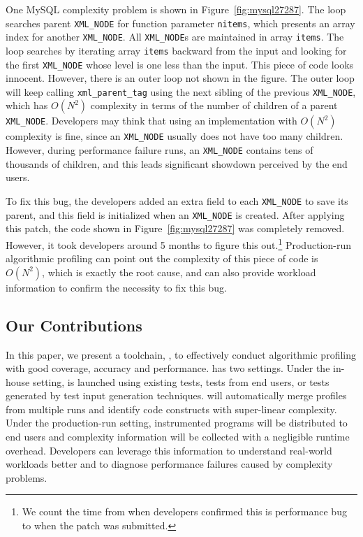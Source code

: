 


One MySQL complexity problem is shown in Figure~\ref{fig:mysql27287}.
The loop searches parent \texttt{XML\_NODE} for function parameter \texttt{nitems},
which presents an array index for another \texttt{XML\_NODE}.
All \texttt{XML\_NODE}s are maintained in array \texttt{items}.
The loop searches by iterating array \texttt{items}
backward from the input and looking for the first \texttt{XML\_NODE}
whose level is one less than the input.
This piece of code looks innocent.
However, there is an outer loop not shown in the figure.
The outer loop will keep calling \texttt{xml\_parent\_tag} using
the next sibling of the previous \texttt{XML\_NODE},
which has $O(N^2)$ complexity in terms of the number of children of a parent \texttt{XML\_NODE}.
Developers may think that using an implementation with $O(N^2)$ complexity is fine,
since an \texttt{XML\_NODE} usually does not have too many children.
However, during performance failure runs,
an \texttt{XML\_NODE} contains tens of thousands of children,
and this leads significant showdown perceived by the end users.

To fix this bug, the developers added an extra field to each \texttt{XML\_NODE} to save its parent,
and this field is initialized when an \texttt{XML\_NODE} is created.
After applying this patch, the code shown in Figure~\ref{fig:mysql27287} was completely removed.
However, it took developers around 5 months to figure this
out.\footnote{We count the time from when developers confirmed this is performance bug
to when the patch was submitted.}
Production-run algorithmic profiling 
can point out the complexity of this piece of code is $O(N^2)$, 
which is exactly the root cause, 
and can also provide workload information 
to confirm the necessity to fix this bug.



\subsection{Our Contributions}
\label{sec:con}

In this paper,
we present a toolchain, \Tool, to effectively conduct algorithmic profiling with
good coverage, accuracy and performance.
\Tool has two settings. %
Under the in-house setting,
\Tool is launched using existing tests, tests from end users,
or tests generated by test input generation techniques\cite{KLEE,s2e,dart,EventBreak}.
\Tool will automatically merge profiles from multiple runs and
identify code constructs with super-linear complexity.
Under the production-run setting,
instrumented programs will be distributed to end users
and complexity information will be collected with a negligible runtime overhead.
Developers can leverage this information to understand real-world workloads better
and to diagnose performance failures caused by complexity problems.


